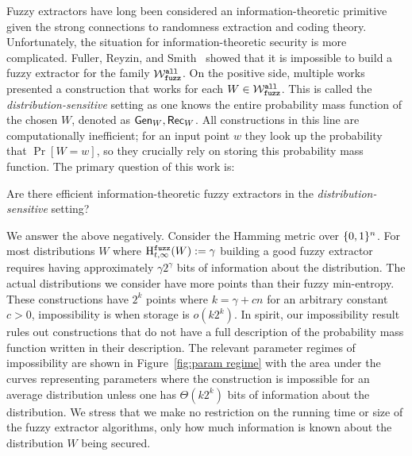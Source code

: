 Fuzzy extractors have long been considered an information-theoretic primitive given the strong connections to randomness extraction and coding theory.  Unfortunately, the situation for information-theoretic security is more complicated.  Fuller, Reyzin, and Smith~\cite{fuller2020fuzzy} showed that it is impossible to build a fuzzy extractor for the family $\mathcal{W}_{\mathtt{fuzz}}^{\mathtt{all}}$.  On the positive side, multiple works~\cite{hayashi2014secret,hayashi2016secret,fuller2016fuzzy,woodage2017new,tyagi2017universal,TVW18,LA18,fuller2019continuous,fuller2020fuzzy} presented a construction that works for each $W\in \mathcal{W}_{\mathtt{fuzz}}^{\mathtt{all}}$.  This is called the \emph{distribution-sensitive} setting as one knows the entire probability mass function of the chosen $W$, denoted as ${\mathsf{Gen}}_W, {\mathsf{Rec}}_W$.  All constructions in this line are computationally inefficient; for an input point $w$ they look up the probability that $\Pr[W=w]$, so they crucially rely on storing this probability mass function.  
The primary question of this work is:
\begin{displayquote}
Are there efficient information-theoretic fuzzy extractors in the \emph{distribution-sensitive} setting? 
\end{displayquote}

We answer the above negatively.  Consider the Hamming metric over $\{0, 1\}^n$. For most distributions $W$ where $\mathrm{H}^{\mathtt{fuzz}}_{t,\infty}(W) := \gamma$ building a good fuzzy extractor requires having approximately $\gamma 2^\gamma$ bits of information about the distribution. The actual distributions we consider have more points than their fuzzy min-entropy.  These constructions have $2^k$ points where $k = \gamma + c n$ for an arbitrary constant $c>0$, impossibility is when storage is $o(k2^k)$.  In spirit, our impossibility result rules out constructions that do not have a full description of the probability mass function written in their description.  The relevant parameter regimes of impossibility are shown in Figure~\ref{fig:param regime} with the area under the curves representing parameters where the construction is impossible for an average distribution unless one has $\Theta(k 2^k)$ bits of information about the distribution.  We stress that we make no restriction on the running time or size of the fuzzy extractor algorithms, only how much information is known about the distribution $W$ being secured.  


